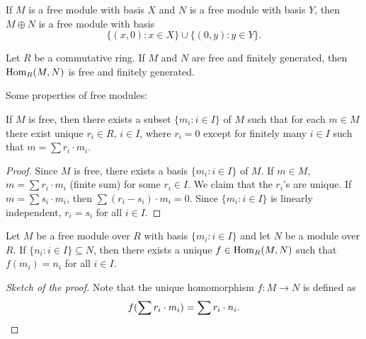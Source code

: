 \begin{example}
If $M$ is a free module with basis $X$ and $N$ 
is a free module with basis $Y$, then 
$M\oplus N$ is a free module with basis 
\[
\{(x,0):x\in X\}\cup \{(0,y):y\in Y\}.
\]	
\end{example}

\begin{exercise}
Let $R$ be a commutative ring. If $M$ and $N$ 
are free and finitely generated, then 
$\operatorname{Hom}_R(M,N)$
is free and finitely generated.
\end{exercise}

Some properties of free modules:

\begin{proposition}
If $M$ is free, then there exists a subset $\{m_i:i\in I\}$ of $M$ 
such that for each $m\in M$ there exist unique $r_i\in R$, $i\in I$, 
where $r_i=0$ except for finitely many $i\in I$ 
such that $m=\sum r_i\cdot m_i$. 
\end{proposition}

\begin{proof}
Since $M$ is free, there exists a basis $\{m_i:i\in I\}$ of $M$. If $m\in M$,
$m=\sum r_i\cdot m_i$ (finite sum) for some $r_i\in I$. We claim that
the $r_i$'s are unique. If $m=\sum s_i\cdot m_i$, then
$\sum (r_i-s_i)\cdot m_i=0$. Since $\{m_i:i\in I\}$ 
is linearly independent, $r_i=s_i$ for all $i\in I$.  	
\end{proof}

\begin{proposition}
\label{pro:libre}
Let $M$ be a free module over $R$ with basis $\{m_i:i\in I\}$ and let $N$ be a module over $R$. 
If $\{n_i:i\in I\}\subseteq N$, then 
there exists a unique $f\in\operatorname{Hom}_R(M,N)$ such that
$f(m_i)=n_i$ for all $i\in I$.  
\end{proposition}

\begin{proof}[Sketch of the proof]
Note that the unique homomorphism $f\colon M\to N$ is defined as 
\[ 
f(\sum r_i\cdot m_i)=\sum r_i\cdot n_i.\qedhere 
\]
\end{proof}

